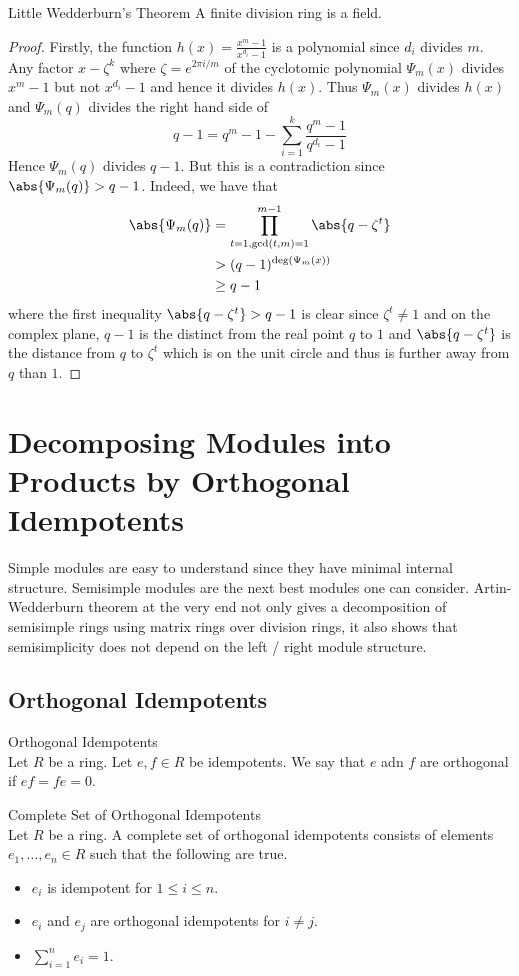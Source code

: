 \documentclass[a4paper]{article}
\begin{document}
\begin{thm}{Little Wedderburn's Theorem}{} A finite division ring is a field. 
\begin{proof}
Firstly, the function $h(x)=\frac{x^m-1}{x^{d_i}-1}$ is a polynomial since $d_i$ divides $m$. Any factor $x-\zeta^k$ where $\zeta=e^{2\pi i/m}$ of the cyclotomic polynomial $\Psi_m(x)$ divides $x^m-1$ but not $x^{d_i}-1$ and hence it divides $h(x)$. Thus $\Psi_m(x)$ divides $h(x)$ and $\Psi_m(q)$ divides the right hand side of $$q-1=q^m-1-\sum_{i=1}^k\frac{q^m-1}{q^{d_i}-1}$$ Hence $\Psi_m(q)$ divides $q-1$. But this is a contradiction since $\abs{\Psi_m(q)}>q-1$. Indeed, we have that 
\begin{align*}
\abs{\Psi_m(q)}&=\prod_{t=1,\gcd(t,m)=1}^{m-1}\abs{q-\zeta^t}\\
&>(q-1)^{\deg(\Psi_m(x))}\\
&\geq q-1
\end{align*}
where the first inequality $\abs{q-\zeta^t}>q-1$ is clear since $\zeta^t\neq 1$ and on the complex plane, $q-1$ is the distinct from the real point $q$ to $1$ and $\abs{q-\zeta^t}$ is the distance from $q$ to $\zeta^t$ which is on the unit circle and thus is further away from $q$ than $1$. 
\end{proof}
\end{thm}

\pagebreak
\section{Decomposing Modules into Products by Orthogonal Idempotents}
Simple modules are easy to understand since they have minimal internal structure. Semisimple modules are the next best modules one can consider. Artin-Wedderburn theorem at the very end not only gives a decomposition of semisimple rings using matrix rings over division rings, it also shows that semisimplicity does not depend on the left / right module structure. 

\subsection{Orthogonal Idempotents}
\begin{defn}{Orthogonal Idempotents}{}\\
Let $R$ be a ring. Let $e,f\in R$ be idempotents. We say that $e$ adn $f$ are orthogonal if $ef=fe=0$. 
\end{defn}

\begin{defn}{Complete Set of Orthogonal Idempotents}{}\\
Let $R$ be a ring. A complete set of orthogonal idempotents consists of elements $e_1,\dots,e_n\in R$ such that the following are true. 
\begin{itemize}
\item $e_i$ is idempotent for $1\leq i\leq n$. 
\item $e_i$ and $e_j$ are orthogonal idempotents for $i\neq j$. 
\item $\sum_{i=1}^ne_i=1$. 
\end{itemize}
\end{defn}
\end{document}
